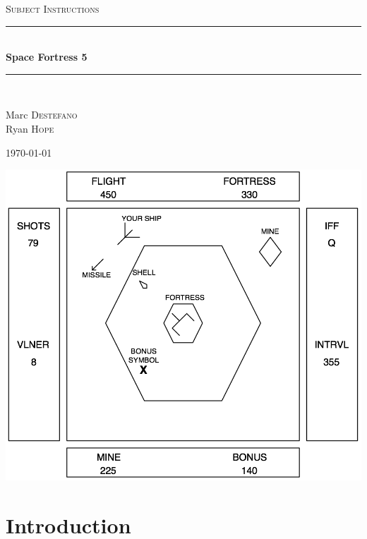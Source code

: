 \documentclass[letterpaper,12pt]{article}
\newcommand{\HRule}{\rule{\linewidth}{0.5mm}}
\begin{document}
\begin{titlepage}

\begin{center}

\null

\vfill

\textsc{\Large Subject Instructions}\\[0.5cm]

\HRule \\[0.7cm]
{ \huge \bfseries Space Fortress 5}\\[0.4cm]

\HRule \\[1.5cm]

\begin{minipage}{0.4\textwidth}
\begin{center} \large
Marc \textsc{Destefano}\\
Ryan \textsc{Hope}
\end{center}
\end{minipage}

\vfill

{\large \today}

\newpage
\thispagestyle{empty}
\null
\vfill
\includegraphics[width=\textwidth]{SF5.png}
\vfill
\end{center}
\newpage

\end{titlepage}

\section{Introduction}
\end{document}
